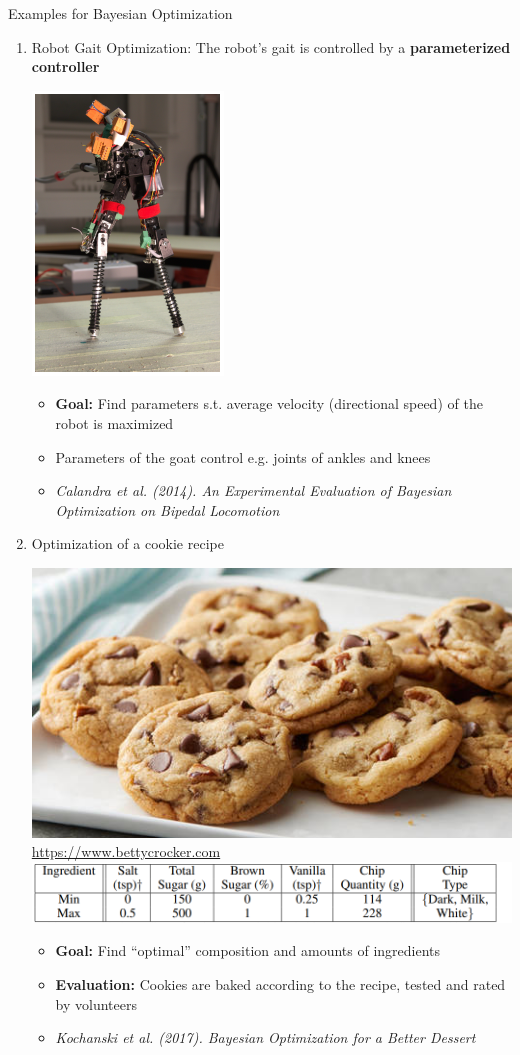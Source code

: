 \documentclass[11pt,compress,t,notes=noshow, xcolor=table]{beamer}
\begin{document}
\begin{vbframe}{Examples for Bayesian Optimization} 
\begin{enumerate}
\item Robot Gait Optimization: The robot's gait is controlled by a \textbf{parameterized controller}

\medskip

\begin{center}
\includegraphics[width = 2.5 cm]{figure_man/robot_gait.png}\\
\end{center}
\begin{footnotesize}
\begin{itemize}
\item \textbf{Goal: } Find parameters s.t. average velocity (directional speed) of the robot is maximized
\item Parameters of the goat control e.g. joints of ankles and knees
\item \emph{Calandra et al. (2014). An Experimental Evaluation of Bayesian Optimization on Bipedal Locomotion}
\end{itemize}
\end{footnotesize}

\framebreak 

\item Optimization of a cookie recipe
\medskip

\begin{center}
\includegraphics[width = 5 cm]{figure_man/cookie.jpg}\\
\tiny{\url{https://www.bettycrocker.com}} \\
\includegraphics[width = 8 cm]{figure_man/cookie2.png}
\end{center}
\begin{itemize}
\item \textbf{Goal: } Find \enquote{optimal} composition and amounts of ingredients 
\item \textbf{Evaluation: } Cookies are baked according to the recipe, tested and rated by volunteers
\item \emph{Kochanski et al. (2017). Bayesian Optimization for a Better Dessert}
\end{itemize}

\end{enumerate}
\end{vbframe}
\end{document}
